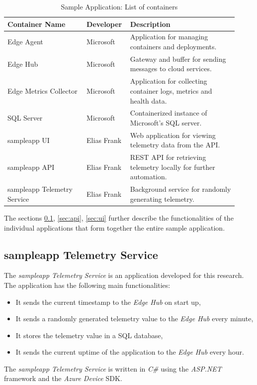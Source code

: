 \begin{table}[H]
    \centering
    \begin{tabular}{ p{0.33\linewidth} p{0.14\linewidth} p{0.45\linewidth}}
        \toprule
        \textbf{Container Name} & \textbf{Developer} & \textbf{Description} \\
        \midrule
        Edge Agent & Microsoft & Application for managing containers and deployments. \\
        Edge Hub & Microsoft & Gateway and buffer for sending messages to cloud services. \\
        Edge Metrics Collector & Microsoft & Application for collecting container logs, metrics and health data. \\
        SQL Server & Microsoft & Containerized instance of Microsoft's SQL server. \\
        sampleapp UI & Elias Frank & Web application for viewing telemetry data from the \ac{API}. \\
        sampleapp API & Elias Frank & \ac{REST} \ac{API} for retrieving telemetry locally for further automation. \\
        sampleapp Telemetry Service & Elias Frank & Background service for randomly generating telemetry. \\
        \bottomrule
    \end{tabular}
    \caption{Sample Application: List of containers}
    \label{tab:containers}
\end{table}

The sections \ref{sec:telemetry-service}, \ref{sec:api}, \ref{sec:ui} further
describe the functionalities of the individual applications that form together
the entire sample application.

\subsection{sampleapp Telemetry Service} \label{sec:telemetry-service}
The \textit{sampleapp Telemetry Service} is an application developed for this
research. The application has the following main functionalities:

\begin{itemize}
    \item It sends the current timestamp to the \textit{Edge Hub} on start up,
    \item It sends a randomly generated telemetry value to the
    \textit{Edge Hub} every minute,
    \item It stores the telemetry value in a \ac{SQL} database,
    \item It sends the current uptime of the application to the \textit{Edge Hub}
    every hour.
\end{itemize}
The \textit{sampleapp Telemetry Service} is written in \textit{C\#} using the
\textit{ASP.NET} framework and the \textit{Azure Device} \ac{SDK}.

